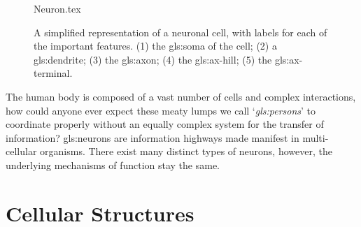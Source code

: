 \documentclass[../../Orator]{subfiles}
\begin{document}
\begin{figure}[h]
    \centering
    {Neuron.tex}
    \caption{A simplified representation of a neuronal cell, with labels for each of the important features. (1) the \gls{gls:soma} of the cell; (2) a \gls{gls:dendrite}; (3) the \gls{gls:axon}; (4) the \gls{gls:ax-hill}; (5) the \gls{gls:ax-terminal}.}\label{fig:Neuron}
\end{figure}

The human body is composed of a vast number of cells and complex interactions, how could anyone ever expect these meaty lumps we call `\textit{\glspl{gls:person}}' to coordinate properly without an equally complex system for the transfer of information? 
\Glspl{gls:neuron} are information highways made manifest in multi-cellular organisms. 
There exist many distinct types of neurons, however, the underlying mechanisms of function stay the same.

\section{Cellular Structures}

\begin{comment}
    \subsection{Organelles}
    {\noindent
    Nucleus \\
    Ribosomes \\
    Golgi-Apparatus \\
    Endoplasmic Reticulum, rough \& smooth \\
    Lysosome
    }
\end{comment}
\end{document}
